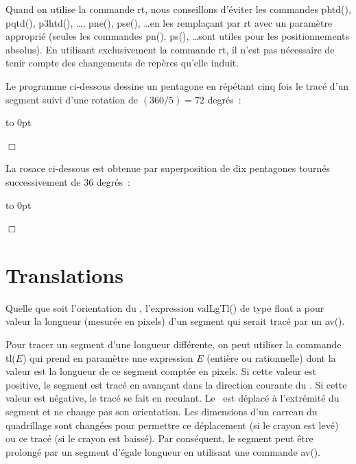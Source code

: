 Quand on utilise la commande {\idt rt}, nous conseillons d'éviter les commandes {\idt phtd()}, 
{\idt pqtd()},  {\idt p3htd()}, \ldots, {\idt pne()}, {\idt pse()}, \ldots en les remplaçant par {\idt rt} avec un paramètre
approprié (seules les commandes {\idt pn()}, {\idt ps()}, \ldots sont utiles pour les positionnements absolus). 
En utilisant exclusivement la commande {\idt  rt}, il n'est pas nécessaire de tenir 
compte des changements de repères  qu'elle induit. 
\begin{exemple}[Pentagone]{\rm
Le programme ci-dessous dessine un pentagone en répétant cinq fois le tracé d'un segment suivi
d'une rotation de $(360 / 5) = 72$ degrés~:

 {\raggedright 
 \vbox to 0pt{}%
 
 \vspace{1.6cm}%
 }
\noindent $\Box$ }\end{exemple}
\begin{exemple}{\rm
La rosace ci-dessous est obtenue par superposition de dix pentagones tournés successivement de 36 degrés~:

 {\raggedright 
 \vbox to 0pt{}%
 
 }
\noindent $\Box$ }\end{exemple}

\section{Translations}
Quelle que soit l'orientation du \robot, l'expression  {\idt valLgTl()} de type {\idt float} a pour valeur la longueur
 (mesurée en pixels) d'un segment qui serait tracé par un {\idt av()}. 
 
 Pour tracer un segment d'une longueur différente, on peut utiliser la commande {\idt tl(}$E${\idt )} qui 
 prend en paramètre une expression $E$ (entière ou rationnelle) dont la valeur est la 
 longueur de ce segment 
 comptée en pixels. Si cette valeur est positive, le segment est tracé en avançant dans la 
 direction courante du \robot. Si cette valeur est négative, le tracé se fait en reculant. Le \robot\
 est déplacé à l'extrémité du segment et ne change pas son orientation. Les dimensions
 d'un carreau du quadrillage sont changées pour permettre ce déplacement (si le crayon est levé)
 ou ce tracé (si le crayon est baissé). Par conséquent, le segment peut être prolongé
 par un segment d'égale longueur en utilisant une commande {\idt av()}.
 
